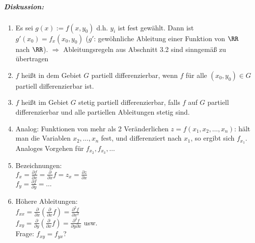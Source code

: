 \subparagraph{Diskussion:} 
\begin{enumerate}
\item Es sei $g(x):= f(x,y_0)$ d.h. $y_i$ ist fest gewählt. Dann ist $g'(x_0)=f_x(x_0,y_0)$ ($g'$: gewöhnliche Ableitung einer Funktion von $\RR$ nach $\RR$). $\Rightarrow$ Ableitungsregeln aus Abschnitt 3.2 sind sinngemäß zu übertragen
\item $f$ heißt in dem Gebiet $G$ partiell differenzierbar, wenn $f$ für alle $(x_0, y_0) \in G$ partiell differenzierbar ist.
\item $f$ heißt im Gebiet $G$ stetig partiell differenzierbar, falls $f$ auf $G$ partiell differenzierbar und alle partiellen Ableitungen stetig sind.
\item Analog: Funktionen von mehr als 2 Veränderlichen $z=f(x_1 ,x_2, \dots, x_n)$: hält man die Variablen $x_2, \dots, x_n$ fest, und differenziert nach $x_1$, so ergibt sich $f_{x_1}$. Analoges Vorgehen für $f_{x_2}, f_{x_3}, \dots$
\item Bezeichnungen:\\
$f_x=\frac{\partial f}{\partial x}=\frac{\partial}{\partial x}f = z_x=\frac{\partial z}{\partial x}$\\
$f_y=\frac{\partial f}{\partial y}=\dots$
\item Höhere Ableitungen:\\
$f_{xx}=\frac{\partial}{\partial x} \left( \frac{\partial}{\partial x}f\right) = \frac{\partial^2 f}{\partial x^2}$\\
$f_{xy}=\frac{\partial}{\partial y}\left(\frac{\partial}{\partial x}f\right) = \frac{\partial^2 f}{\partial y \partial x}$ usw.\\
Frage: $f_{xy}=f_{yx}$?
\end{enumerate}
